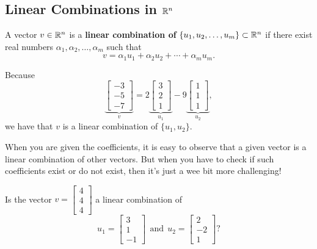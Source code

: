 \subsection{Linear Combinations in $\mathbb R^n$}

\begin{tcolorbox}[title=\textbf{Linear Combination}]
A vector $v\in \mathbb R^n$ is a \textbf{linear combination of} $\{u_1, u_2, \ldots, u_m\} \subset \mathbb R^n$ if there exist real numbers $\alpha_1, \alpha_2, \ldots, \alpha_m$ such that
\begin{equation}
    \label{eq:DefLinearCombinationRn}
    v = \alpha_1 u_1 + \alpha_2 u_2 + \cdots + \alpha_m u_m.
\end{equation}

\end{tcolorbox}

\vspace*{0.5cm}

\begin{example}
\label{ex:LinearComboA1}
Because 
$$\underbrace{\begin{bmatrix} -3 \\  -5 \\ -7\end{bmatrix}}_{v}=2\underbrace{\begin{bmatrix} 3 \\  2 \\ 1\end{bmatrix}}_{u_1} - 9 \underbrace{ \begin{bmatrix} 1 \\  1 \\ 1\end{bmatrix}}_{u_2},$$
we have that $v$ is a linear combination of $\{u_1, u_2\}$.
\end{example}

When you are given the coefficients, it is easy to observe that a given vector is a linear combination of other vectors. But when you have to check if such coefficients exist or do not exist, then it's just a wee bit more challenging!
\vspace*{0.5cm}

\begin{example}
\label{ex:LinearComboA2}
Is the vector $v= \begin{bmatrix} 4 \\  4 \\ 4\end{bmatrix}$ a linear combination of 
$$u_1=\left[\begin{array}{r} 3 \\ 1\\ -1  \end{array} \right]~~\text{and}~~u_2=\left[\begin{array}{r} 2 \\ -2\\ 1  \end{array} \right]? $$
\end{example}

